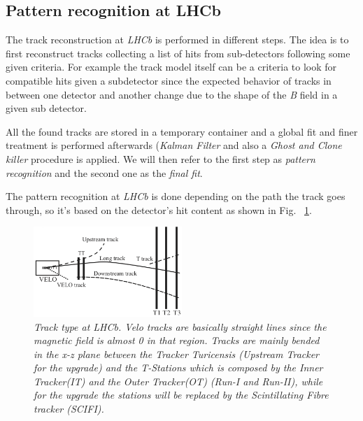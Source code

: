 \documentclass[paper=a4, fontsize=10pt]{scrartcl}
\numberwithin{equation}{section}		%
\numberwithin{figure}{section}			%
\numberwithin{table}{section}				%
\begin{document}
\subsection{Pattern recognition at LHCb}


The track reconstruction at \textit{LHCb} is performed in different steps. The idea is to first reconstruct tracks collecting a list of hits from sub-detectors following some given criteria. For example the track model itself can be a criteria to look for compatible hits given a subdetector since the expected behavior of tracks in between one detector and another change due to the shape of the \textit{B} field in a given sub detector.

All the found tracks are stored in a temporary container and a global fit and finer treatment is performed afterwards (\textit{Kalman Filter} and also a \textit{Ghost and Clone killer} procedure is applied. We will then refer to the first step as \textit{pattern recognition} and the second one as the \textit{final fit}. 

The pattern recognition at \textit{LHCb} is done depending on the path the track goes through, so it's based on the detector's hit content as shown in Fig. ~\ref{figure:Tracks}.
\begin{figure}[h]
  \begin{center}
    \includegraphics[width=0.5\textwidth]{Images/tracktype.png} 
  \caption[Caption for track type]{\emph{Track type at \textit{LHCb}. Velo tracks are basically straight lines since the magnetic field is almost 0 in that region. Tracks are mainly bended in the x-z \footnotemark plane between the Tracker Turicensis (Upstream Tracker for the upgrade) and the T-Stations which is composed by the Inner Tracker(IT) and the Outer Tracker(OT) (Run-I and Run-II), while for the upgrade the stations will be replaced by the Scintillating Fibre tracker (SCIFI).}}
  \label{figure:Tracks}
  \end{center}
\end{figure}
\end{document}
